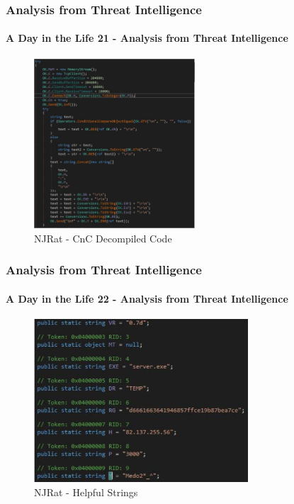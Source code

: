 \documentclass[aspectratio=169]{beamer}
\begin{document}
\begin{frame}
  \frametitle{Analysis from Threat Intelligence}
  \framesubtitle{A Day in the Life 21 - Analysis from Threat Intelligence}
  \begin{center}
    \begin{figure}
      \includegraphics[width=6cm,keepaspectratio]{njrat_cnc}
      \caption{NJRat - CnC Decompiled Code}
    \end{figure}
  \end{center}
\end{frame}

\begin{frame}
  \frametitle{Analysis from Threat Intelligence}
  \framesubtitle{A Day in the Life 22 - Analysis from Threat Intelligence}
  \begin{center}
    \begin{figure}
      \includegraphics[width=8cm,keepaspectratio]{njrat_strings}
      \caption{NJRat - Helpful Strings}
    \end{figure}
  \end{center}
\end{frame}
\end{document}
